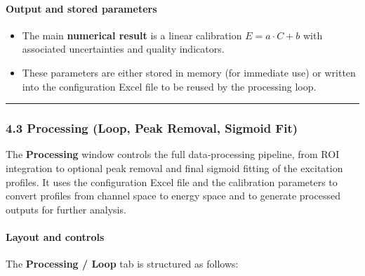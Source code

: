 \hypertarget{output-and-stored-parameters}{%
\paragraph{Output and stored
parameters}\label{output-and-stored-parameters}}

\begin{itemize}
\tightlist
\item
  The main \textbf{numerical result} is a linear calibration
  \(E = a \cdot C + b\) with associated uncertainties and quality
  indicators.
\item
  These parameters are either stored in memory (for immediate use) or
  written into the configuration Excel file to be reused by the
  processing loop.
\end{itemize}

\begin{center}\rule{0.5\linewidth}{0.5pt}\end{center}

\hypertarget{processing-loop-peak-removal-sigmoid-fit}{%
\subsubsection{4.3 Processing (Loop, Peak Removal, Sigmoid
Fit)}\label{processing-loop-peak-removal-sigmoid-fit}}

The \textbf{Processing} window controls the full data‑processing
pipeline, from ROI integration to optional peak removal and final
sigmoid fitting of the excitation profiles. It uses the configuration
Excel file and the calibration parameters to convert profiles from
channel space to energy space and to generate processed outputs for
further analysis.

\hypertarget{layout-and-controls-2}{%
\paragraph{Layout and controls}\label{layout-and-controls-2}}

The \textbf{Processing / Loop} tab is structured as follows:

